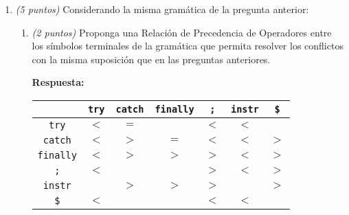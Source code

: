 \documentclass[a4paper,10pt]{article}
\begin{document}
\begin{enumerate}
\begin{enumerate}
            \textbf{Respuesta:} Los conflictos se resolvieron en el mismo
            \href{https://github.com/ArriagaAmin/LenguajesIIParcial1/blob/main/Pregunta1/MC_LR1}{archivo} 
            de la pregunta anterior.\\

            \item \textit{(2 puntos)} A partir de las respuestas anteriores, construya la m\'aquina 
            caracterı\'istica \textit{LALR(1)} y diga si existen conflictos en el mismo. En caso de 
            existir, explique c\'omo los resolverı\'ia (seleccionando una de las acciones que conforma 
            dicho conflicto), con las mismas reglas de la pregunta anterior.

            \textbf{Respuesta:} Se coloc\'o la m\'aquina caracter\'istica, sus conflictos y la forma de 
            resolverlos en el siguiente \href{https://github.com/ArriagaAmin/LenguajesIIParcial1/blob/main/Pregunta1/MC_LALR1}{archivo} 
            del repositorio.\\
        \end{enumerate}

        \newpage

        \item \textit{(5 puntos)} Considerando la misma gram\'atica de la pregunta anterior:
        
        \begin{enumerate}
            \item \textit{(2 puntos)} Proponga una Relaci\'on de Precedencia de Operadores entre los 
            s\'imbolos terminales de la gram\'atica que permita resolver los conflictos con la misma 
            suposici\'on que en las preguntas anteriores. 
            
            \textbf{Respuesta:}
            \begin{center}
                \begin{tabular}{ | c | c | c | c | c | c | c |}
                    \hline
                    & \verb|try| & \verb|catch| & \verb|finally| & \verb|;| & \verb|instr| & \verb|$| \\ \hline
                    \verb|try| & $<$ & $=$ & & $<$ & $<$ & \\ \hline
                    \verb|catch| & $<$ & $>$ & $=$ & $<$ & $<$ & $>$ \\ \hline 
                    \verb|finally| & $<$ & $>$ & $>$ & $>$ & $<$ & $>$ \\ \hline 
                    \verb|;| & $<$ & & & $>$ & $<$ & $>$ \\ \hline 
                    \verb|instr| & & $>$ & $>$ & $>$ & & $>$ \\ \hline 
                    \verb|$| & $<$ & & & $<$ & $<$ & \\ \hline
                \end{tabular}
            \end{center}
            \vspace*{1cm}


\end{enumerate}
\end{enumerate}
\end{document}
